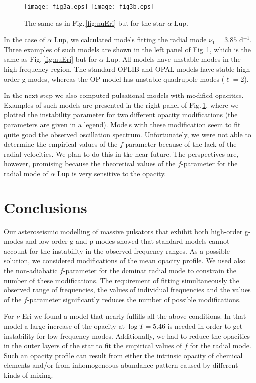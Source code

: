 \documentclass{ptapap}
\begin{document}
\begin{figure}[h]
\texttt{[image: fig3a.eps]}
\texttt{[image: fig3b.eps]}
\caption{The same as in Fig.\,\ref{fig:nuEri} but for the star $\alpha$ Lup.}
\label{fig:alphaLup}
\end{figure}


In the case of $\alpha$ Lup, we calculated models fitting the radial mode $\nu_1=3.85$ d$^{-1}$. Three examples of such models are shown in the left panel of Fig.\,\ref{fig:alphaLup}, which is the same as Fig.\,\ref{fig:nuEri} but for $\alpha$ Lup. All models have unstable modes in the high-frequency region. The standard OPLIB and OPAL models have stable high-order g-modes, whereas the OP model has unstable quadrupole modes ($\ell=2$).

In the next step we also computed pulsational models with modified opacities. Examples of such models are presented in the right panel of Fig.\,\ref{fig:alphaLup}, where we plotted the instability parameter for two different opacity modifications (the parameters are given in a legend).
Models with these modification seem to fit quite good the observed oscillation spectrum.
Unfortunately, we were not able to determine the empirical values of the $f$-parameter because of the lack of the radial velocities. We plan to do this in the near future. The perspectives are, however, promising because the theoretical values of the $f$-parameter for the radial mode of $\alpha$ Lup is very sensitive to the opacity.




\section{Conclusions}
\label{sc}

Our asteroseismic modelling of massive pulsators that exhibit both high-order g-modes and low-order g and p modes showed that standard models cannot account for the instability in the observed frequency ranges. As a possible solution, we considered modifications of the mean opacity profile. We used also the non-adiabatic $f$-parameter for the dominat radial mode to constrain the number of these modifications. The requirement of fitting simultaneously the observed range of frequencies, the values of individual frequencies and the values of the $f$-parameter significantly reduces the number of possible modifications.	

For $\nu$ Eri we found a model that nearly fulfills all the above  conditions. In that model a large increase of the opacity at $\log{T}=5.46$ is needed in order to get instability for low-frequency modes. Additionally, we had to reduce the opacities in the outer layers of the star to fit the empirical values of $f$ for the radial mode.  Such an opacity profile can result from either the intrinsic opacity of chemical elements and/or from inhomogeneous abundance pattern caused by different kinds of mixing.
\end{document}
